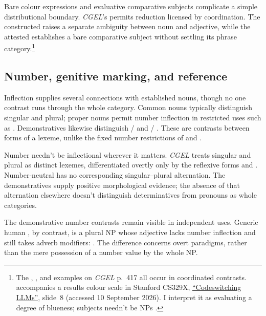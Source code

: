 \documentclass[12pt]{article}
\begin{document}
Bare colour expressions and evaluative comparative subjects complicate a simple distributional boundary. \textit{CGEL}'s  permits reduction licensed by coordination. The constructed  raises a separate ambiguity between noun and adjective, while the attested  establishes a bare comparative subject without settling its phrase category.\footnote{The , , and  examples on \textit{CGEL} p.~417 all occur in coordinated contrasts.  accompanies a results colour scale in Stanford CS329X, \href{https://web.stanford.edu/class/cs329x/slides/Lecture12_B_Codeswitching\%20LLMs.pdf}{\enquote{Codeswitching LLMs}}, slide~8 (accessed 10 September 2026). I interpret it as evaluating a degree of blueness; subjects needn't be NPs \citep[236]{huddleston2002}.}

\subsection{Number, genitive marking, and reference}\label{sec:inflection}

Inflection supplies several connections with established nouns, though no one contrast runs through the whole category. Common nouns typically distinguish singular and plural; proper nouns permit number inflection in restricted uses such as . Demonstratives likewise distinguish / and / \citep[373, 521]{huddleston2002}. These are contrasts between forms of a lexeme, unlike the fixed number restrictions of  and .

Number needn't be inflectional wherever it matters. \textit{CGEL} treats singular and plural  as distinct lexemes, differentiated overtly only by the reflexive forms  and  \citep[486]{huddleston2002}. Number-neutral  has no corresponding singular--plural alternation. The demonstratives supply positive morphological evidence; the absence of that alternation elsewhere doesn't distinguish determinatives from pronouns as whole categories.

The demonstrative number contrasts remain visible in independent uses. Generic human , by contrast, is a plural NP whose adjective lacks number inflection and still takes adverb modifiers:  \citep[418]{huddleston2002}. The difference concerns overt paradigms, rather than the mere possession of a number value by the whole NP.
\end{document}
